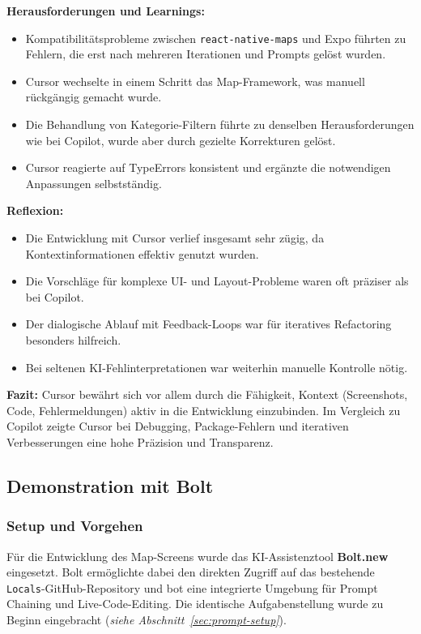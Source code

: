 \textbf{Herausforderungen und Learnings:}
\begin{itemize}
      \item Kompatibilitätsprobleme zwischen \texttt{react-native-maps} und Expo führten zu
            Fehlern, die erst nach mehreren Iterationen und Prompts gelöst wurden.
      \item Cursor wechselte in einem Schritt das Map-Framework, was manuell rückgängig
            gemacht wurde.
      \item Die Behandlung von Kategorie-Filtern führte zu denselben Herausforderungen wie
            bei Copilot, wurde aber durch gezielte Korrekturen gelöst.
      \item Cursor reagierte auf TypeErrors konsistent und ergänzte die notwendigen
            Anpassungen selbstständig.
\end{itemize}

\textbf{Reflexion:}
\begin{itemize}
      \item Die Entwicklung mit Cursor verlief insgesamt sehr zügig, da
            Kontextinformationen effektiv genutzt wurden.
      \item Die Vorschläge für komplexe UI- und Layout-Probleme waren oft präziser als bei
            Copilot.
      \item Der dialogische Ablauf mit Feedback-Loops war für iteratives Refactoring
            besonders hilfreich.
      \item Bei seltenen KI-Fehlinterpretationen war weiterhin manuelle Kontrolle nötig.
\end{itemize}

\textbf{Fazit:}
Cursor bewährt sich vor allem durch die Fähigkeit, Kontext (Screenshots, Code, Fehlermeldungen) aktiv in die Entwicklung einzubinden. Im Vergleich zu Copilot zeigte Cursor bei Debugging, Package-Fehlern und iterativen Verbesserungen eine hohe Präzision und Transparenz.

\subsection{Demonstration mit Bolt}

\subsubsection{Setup und Vorgehen}
Für die Entwicklung des Map-Screens wurde das KI-Assistenztool
\textbf{Bolt.new} eingesetzt. Bolt ermöglichte dabei den direkten Zugriff auf
das bestehende \texttt{Locals}-GitHub-Repository und bot eine integrierte
Umgebung für Prompt Chaining und Live-Code-Editing. Die identische
Aufgabenstellung wurde zu Beginn eingebracht (\emph{siehe
      Abschnitt~\ref{sec:prompt-setup}}).

